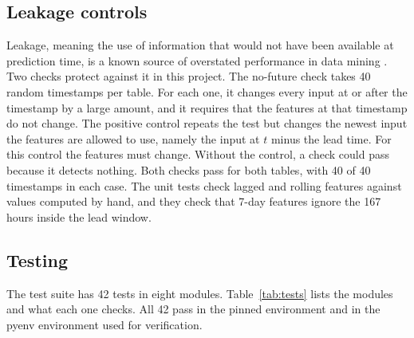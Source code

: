 \documentclass[10pt,journal,compsoc]{IEEEtran}
\begin{document}
\subsection{Leakage controls}
Leakage, meaning the use of information that would not have been available at prediction time, is a known source of overstated performance in data mining \cite{kaufman2012}. Two checks protect against it in this project. The no-future check takes 40 random timestamps per table. For each one, it changes every input at or after the timestamp by a large amount, and it requires that the features at that timestamp do not change. The positive control repeats the test but changes the newest input the features are allowed to use, namely the input at $t$ minus the lead time. For this control the features must change. Without the control, a check could pass because it detects nothing. Both checks pass for both tables, with 40 of 40 timestamps in each case. The unit tests check lagged and rolling features against values computed by hand, and they check that 7-day features ignore the 167 hours inside the lead window.

\subsection{Testing}
The test suite has 42 tests in eight modules. Table~\ref{tab:tests} lists the modules and what each one checks. All 42 pass in the pinned environment and in the pyenv environment used for verification.
\end{document}
